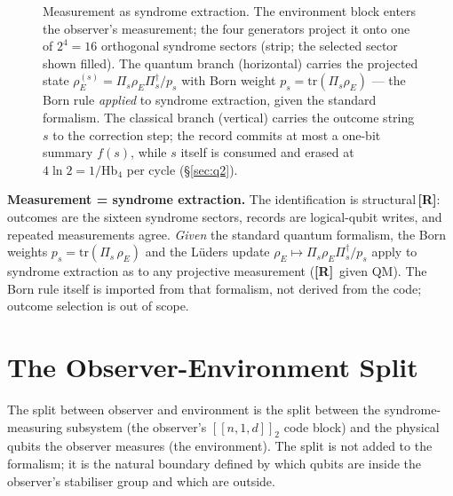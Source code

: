 \documentclass[11pt,a4paper]{article}
\newcommand{\Rmark}{\textcolor{green!50!black}{\textbf{[R]}}}
\providecommand{\Hbfour}{\mathrm{Hb}_4}
\newcommand{\proj}[1]{\Pi_{#1}}
\begin{document}
\begin{figure}[h]
\begin{tikzpicture}[every node/.style={font=\footnotesize}]
\end{tikzpicture}
\caption{Measurement as syndrome extraction. The environment block enters
the observer's measurement; the four generators project it onto one of
$2^4=16$ orthogonal syndrome sectors (strip; the selected sector shown
filled). The quantum branch (horizontal) carries the projected state
$\rho_E^{(s)}=\proj{s}\rho_E\proj{s}^{\dagger}/p_s$ with Born weight
$p_s=\mathrm{tr}(\proj{s}\rho_E)$ --- the Born rule \emph{applied} to
syndrome extraction, given the standard formalism. The classical branch
(vertical) carries the outcome string $s$ to the correction step; the
record commits at most a one-bit summary $f(s)$, while $s$ itself is
consumed and erased at $4\ln2 = 1/\Hbfour$ per cycle (\S\ref{sec:q2}).}
\label{fig:measurement}
\end{figure}

\begin{mdframed}[backgroundcolor=Rbg,linecolor=Rcolor,linewidth=1.5pt]
\textbf{Measurement = syndrome extraction.}\quad
\sloppy The identification is structural\,\Rmark: outcomes are the sixteen syndrome sectors, records are logical-qubit writes, and repeated measurements agree. \emph{Given} the standard quantum formalism, the Born weights $p_s = \mathrm{tr}(\proj{s}\,\rho_E)$ and the L\"uders update $\rho_E\mapsto\proj{s}\rho_E\proj{s}^\dagger/p_s$ apply to syndrome extraction as to any projective measurement (\Rmark\ given QM). The Born rule itself is imported from that formalism, not derived from the code; outcome selection is out of scope.
\end{mdframed}

\section{The Observer-Environment Split}
\label{sec:split}

The split between observer and environment is the split between the syndrome-measuring subsystem (the observer's $[\![n,1,d]\!]_2$ code block) and the physical qubits the observer measures (the environment). The split is not added to the formalism; it is the natural boundary defined by which qubits are inside the observer's stabiliser group and which are outside.
\end{document}
